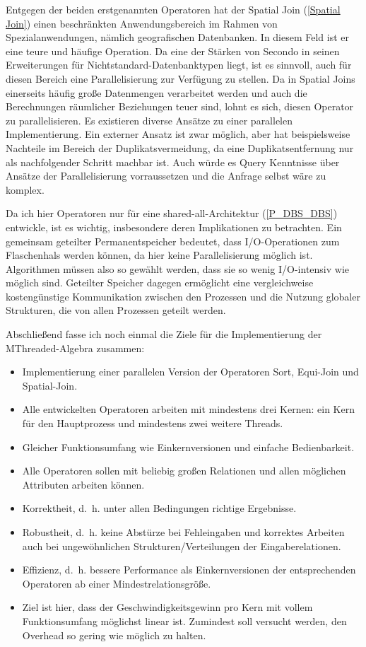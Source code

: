 \documentclass[a4paper,12pt,twoside]{article}
\begin{document}
Entgegen der beiden erstgenannten Operatoren hat der Spatial Join (\autoref{Spatial Join}) einen beschränkten Anwendungsbereich im Rahmen von Spezialanwendungen, nämlich geografischen Datenbanken. In diesem Feld ist er eine teure und häufige Operation. Da eine der Stärken von Secondo in seinen Erweiterungen für Nichtstandard-Datenbanktypen liegt, ist es sinnvoll, auch für diesen Bereich eine Parallelisierung zur Verfügung zu stellen. Da in Spatial Joins einerseits häufig große Datenmengen verarbeitet werden und auch die Berechnungen räumlicher Beziehungen teuer sind, lohnt es sich, diesen Operator zu parallelisieren. Es existieren diverse Ansätze zu einer parallelen Implementierung. Ein externer Ansatz ist zwar möglich, aber hat beispielsweise Nachteile im Bereich der Duplikatsvermeidung, da eine Duplikatsentfernung nur als nachfolgender Schritt machbar ist. Auch würde es Query Kenntnisse über Ansätze der Parallelisierung vorraussetzen und die Anfrage selbst wäre zu komplex. 

Da ich hier Operatoren nur für eine shared-all-Architektur (\autoref{P_DBS_DBS}) entwickle, ist es wichtig, insbesondere deren Implikationen zu betrachten. Ein gemeinsam geteilter Permanentspeicher bedeutet, dass I/O-Operationen zum Flaschenhals werden können, da hier keine Parallelisierung möglich ist. Algorithmen müssen also so gewählt werden, dass sie so wenig I/O-intensiv wie möglich sind. Geteilter Speicher dagegen ermöglicht eine vergleichweise kostengünstige Kommunikation zwischen den Prozessen und die Nutzung globaler Strukturen, die von allen Prozessen geteilt werden.

Abschließend fasse ich noch einmal die Ziele für die Implementierung der MThreaded-Algebra zusammen:

\begin{itemize}
	\item Implementierung einer parallelen Version der Operatoren Sort, Equi-Join und Spatial-Join.
	\item Alle entwickelten Operatoren arbeiten mit mindestens drei Kernen: ein Kern für den Hauptprozess und mindestens zwei weitere Threads.
	\item Gleicher Funktionsumfang wie Einkernversionen und einfache Bedienbarkeit.
	\item Alle Operatoren sollen mit beliebig großen Relationen und allen möglichen Attributen arbeiten können.  
	\item Korrektheit, d.~h. unter allen Bedingungen richtige Ergebnisse.
	\item Robustheit, d.~h. keine Abstürze bei Fehleingaben und korrektes Arbeiten auch bei ungewöhnlichen Strukturen/Verteilungen der Eingaberelationen.
	\item Effizienz, d.~h. bessere Performance als Einkernversionen der entsprechenden Operatoren ab einer Mindestrelationsgröße.
	\item Ziel ist hier, dass der Geschwindigkeitsgewinn pro Kern mit vollem Funktionsumfang möglichst linear ist. Zumindest soll versucht werden, den Overhead so gering wie möglich zu halten.
\end{itemize}
\end{document}
